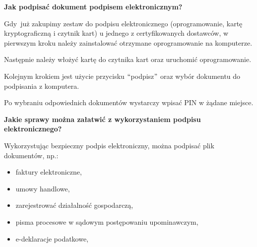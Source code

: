 \documentclass[12pt]{article}
\renewcommand{\_}{\kern-1.5pt\textunderscore\kern-1.5pt}
\begin{document}
\vspace{\baselineskip}
\textbf{Jak podpisać dokument podpisem elektronicznym?}\par


\vspace{\baselineskip}
Gdy\ już zakupimy zestaw do podpisu elektronicznego (oprogramowanie, kartę kryptograficzną i czytnik kart)  u jednego z certyfikowanych dostawców, w pierwszym kroku należy zainstalować otrzymane oprogramowanie na komputerze.\par

Następnie należy włożyć kartę do czytnika kart oraz uruchomić oprogramowanie.\par

Kolejnym krokiem jest użycie przycisku $``$podpisz$"$  oraz wybór dokumentu do podpisania z komputera.\par

Po wybraniu odpowiednich dokumentów wystarczy wpisać PIN w żądane miejsce.\par


\vspace{\baselineskip}
\textbf{Jakie sprawy można załatwić z wykorzystaniem podpisu elektronicznego?}\par


\vspace{\baselineskip}
Wykorzystując bezpieczny podpis elektroniczny, można podpisać plik dokumentów, np.:\par


\vspace{\baselineskip}
\begin{itemize}
	\item faktury elektroniczne,\par


\vspace{\baselineskip}
	\item umowy handlowe,\par


\vspace{\baselineskip}
	\item zarejestrować działalność gospodarczą,\par


\vspace{\baselineskip}
	\item pisma procesowe w sądowym postępowaniu upominawczym,\par


\vspace{\baselineskip}
	\item e-deklaracje podatkowe,
\end{itemize}\par


\vspace{\baselineskip}

\vspace{\baselineskip}

\printbibliography
\end{document}

